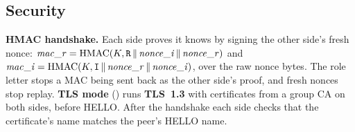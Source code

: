 \subsection{Security}
\label{sec:proto-security}

\textbf{HMAC handshake.} Each side proves it knows  by signing the other side's fresh nonce:
$\mathit{mac\_r} = \mathrm{HMAC}(K, \mbox{\texttt{R}} \,\|\, \mathit{nonce\_i} \,\|\, \mathit{nonce\_r})$ and
$\mathit{mac\_i} = \mathrm{HMAC}(K, \mbox{\texttt{I}} \,\|\, \mathit{nonce\_r} \,\|\, \mathit{nonce\_i})$,
over the raw nonce bytes. The role letter stops a MAC being sent back as the other side's proof,
and fresh nonces stop replay. \textbf{TLS mode} () runs \textbf{TLS~1.3} with certificates from a
group CA on both sides, before HELLO. After the handshake each side checks that the certificate's
name matches the peer's HELLO name.
